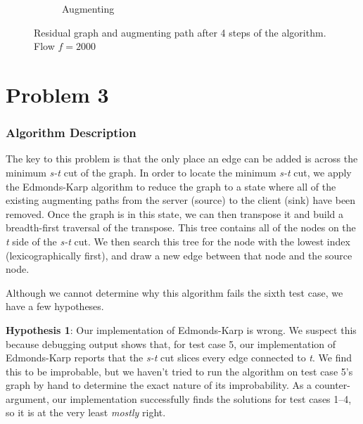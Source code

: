 \documentclass{math}
\begin{document}
\begin{figure}
\begin{subfigure}[h]{0.49\textwidth}
        \caption{Augmenting}
    \end{subfigure}
    \caption{Residual graph and augmenting path after 4 steps of the algorithm.
    Flow $f = 2000$}
    \label{fig:step4}
\end{figure}


\section*{Problem 3}


\subsubsection*{Algorithm Description}

The key to this problem is that the only place an edge can be added is across
the minimum \emph{s-t} cut of the graph.  In order to locate the minimum
\emph{s-t} cut, we apply the Edmonds-Karp algorithm to reduce the graph to a
state where all of the existing augmenting paths from the server (source) to the
client (sink) have been removed.  Once the graph is in this state, we can then
transpose it and build a breadth-first traversal of the transpose.  This tree
contains all of the nodes on the \emph{t} side of the \emph{s-t} cut.  We then
search this tree for the node with the lowest index (lexicographically first),
and draw a new edge between that node and the source node.

Although we cannot determine why this algorithm fails the sixth test case, we
have a few hypotheses.

\textbf{Hypothesis 1}: Our implementation of Edmonds-Karp is wrong.  We suspect
this because debugging output shows that, for test case 5, our implementation of
Edmonds-Karp reports that the \emph{s-t} cut slices every edge connected to
\emph{t}.  We find this to be improbable, but we haven't tried to run the
algorithm on test case 5's graph by hand to determine the exact nature of its
improbability.  As a counter-argument, our implementation successfully finds the
solutions for test cases 1--4, so it is at the very least \emph{mostly} right.
\end{document}
